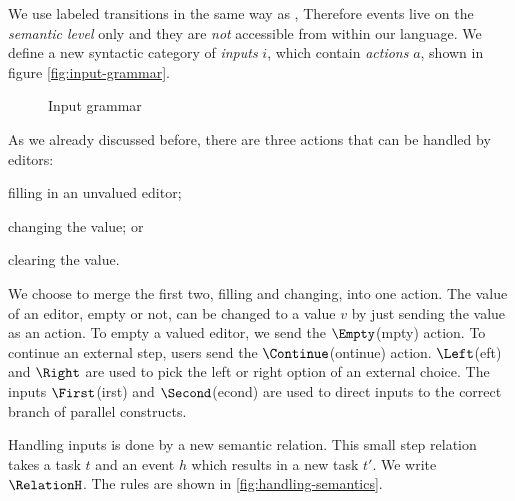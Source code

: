 %
We use labeled transitions in the same way as \textcite{school/maktoberdorf/PeytonJones01},
Therefore events live on the \emph{semantic level} only
and they are \emph{not} accessible from within our language.
We define a new syntactic category of \emph{inputs} $i$,
which contain \emph{actions} $a$,
shown in figure \autoref{fig:input-grammar}.

\begin{figure}[h]
  \small
  \caption{Input grammar} \label{fig:input-grammar}
\end{figure}

As we already discussed before,
there are three actions that can be handled by editors:
\begin{enumerate*}
  \item filling in an unvalued editor;
  \item changing the value; or
  \item clearing the value.
\end{enumerate*}
We choose to merge the first two, filling and changing, into one action.
The value of an editor, empty or not, can be changed to a value $v$ by just sending the value as an action.
To empty a valued editor, we send the $\Empty$(mpty) action.
To continue an external step, users send the $\Continue$(ontinue) action.
$\Left$(eft) and $\Right$ are used to pick the left or right option of an external choice.
The inputs $\First$(irst) and $\Second$(econd) are used to direct inputs to the correct branch of parallel constructs.

Handling inputs is done by a new semantic relation.
This small step relation takes a task $t$ and an event $h$ which results in a new task $t'$.
We write $\RelationH$.
The rules are shown in \cref{fig:handling-semantics}.

